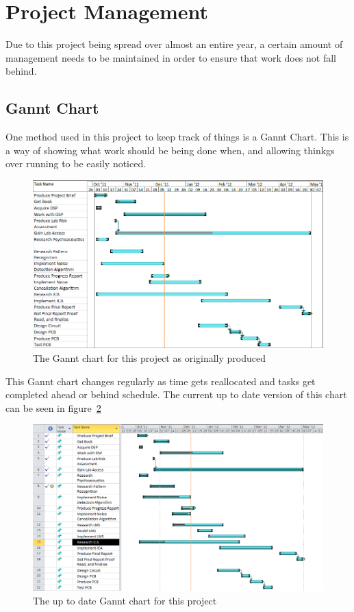 \section{Project Management}
Due to this project being spread over almost an entire year, a certain amount of management needs to be maintained in order to ensure that work does not fall behind.

\subsection{Gannt Chart}
One method used in this project to keep track of things is a Gannt Chart.
This is a way of showing what work should be being done when, and allowing thinkgs over running to be easily noticed.

\begin{figure}[h]
	\centering
	\includegraphics[width=\textwidth]{./img/ganntori.png}
	\caption{The Gannt chart for this project as originally produced}
	\label{fig:gannt}
\end{figure}

This Gannt chart changes regularly as time gets reallocated and tasks get completed ahead or behind schedule.
The current up to date version of this chart can be seen in figure~\ref{fig:newgannt}

\begin{figure}[H]
	\centering
	\includegraphics[width=\textwidth]{./img/ganntnew.png}
	\caption{The up to date Gannt chart for this project}
	\label{fig:newgannt}
\end{figure}

